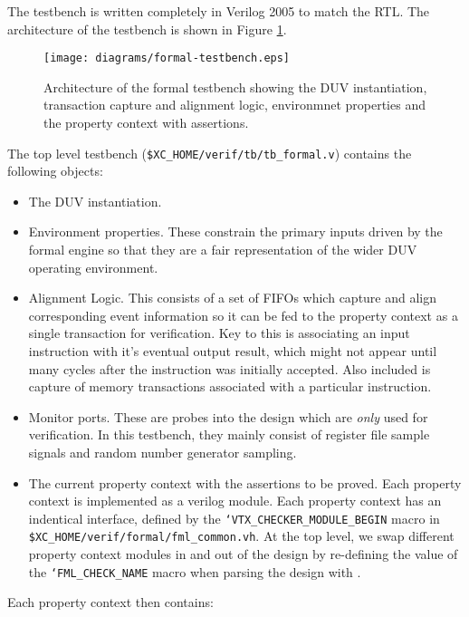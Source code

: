 The testbench is written completely in Verilog 2005 to match the RTL.
The architecture of the testbench is shown in Figure
\ref{fig:formal-tb-arch}.

\begin{figure}[h]
\centering
\texttt{[image: diagrams/formal-testbench.eps]}
\caption{Architecture of the formal testbench showing the DUV instantiation,
transaction capture and alignment logic, environmnet properties and
the property context with assertions.}
\label{fig:formal-tb-arch}
\end{figure}

The top level testbench ({\tt \$XC\_HOME/verif/tb/tb\_formal.v}) contains
the following objects:

\begin{itemize}
\item The DUV instantiation.
\item Environment properties.
    These constrain the primary inputs driven by the formal engine so that
    they are a fair representation of the wider DUV operating environment.
\item Alignment Logic.
    This consists of a set of FIFOs which capture and align corresponding
    event information so it can be fed to the property context as a single
    transaction for verification.
    Key to this is associating an input instruction with it's eventual
    output result, which might not appear until many cycles after the
    instruction was initially accepted.
    Also included is capture of memory transactions associated with a
    particular instruction.
\item Monitor ports.
    These are probes into the design which are {\em only} used for
    verification. In this testbench, they mainly consist of register file
    sample signals and random number generator sampling.
\item The current property context with the assertions to be proved.
    Each property context is implemented as a verilog module.
    Each property context has an indentical interface, defined by the
    {\tt `VTX\_CHECKER\_MODULE\_BEGIN}
    macro in
    {\tt \$XC\_HOME/verif/formal/fml\_common.vh}.
    At the top level, we swap different property context modules in and
    out of the design by re-defining the value of the
    {\tt `FML\_CHECK\_NAME}
    macro when parsing the design with \yosys.
\end{itemize}

\noindent
Each property context then contains:


